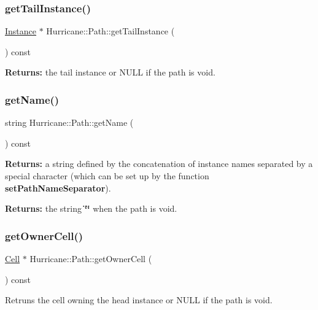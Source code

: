 \subsubsection{\texorpdfstring{get\+Tail\+Instance()}{getTailInstance()}}
{\footnotesize\ttfamily \hyperlink{classHurricane_1_1Instance}{Instance} $\ast$ Hurricane\+::\+Path\+::get\+Tail\+Instance (\begin{DoxyParamCaption}{ }\end{DoxyParamCaption}) const}

{\bfseries Returns\+:} the tail instance or N\+U\+LL if the path is void. \mbox{\label{classHurricane_1_1Path_a97ff25c53f4e7bdacb7cb8a58adf6499}} 
\subsubsection{\texorpdfstring{get\+Name()}{getName()}}
{\footnotesize\ttfamily string Hurricane\+::\+Path\+::get\+Name (\begin{DoxyParamCaption}{ }\end{DoxyParamCaption}) const}

{\bfseries Returns\+:} a string defined by the concatenation of instance names separated by a special character (which can be set up by the function {\bfseries set\+Path\+Name\+Separator}).

{\bfseries Returns\+:} the string {\bfseries \char`\"{}\char`\"{}} when the path is void. \mbox{\label{classHurricane_1_1Path_a0954eb842af9d863ea701aa0b681412e}} 
\subsubsection{\texorpdfstring{get\+Owner\+Cell()}{getOwnerCell()}}
{\footnotesize\ttfamily \hyperlink{classHurricane_1_1Cell}{Cell} $\ast$ Hurricane\+::\+Path\+::get\+Owner\+Cell (\begin{DoxyParamCaption}{ }\end{DoxyParamCaption}) const}

Retruns the cell owning the head instance or N\+U\+LL if the path is void. \mbox{\label{classHurricane_1_1Path_a3f4a865f570375ec5b6e5cb487369696}} 
